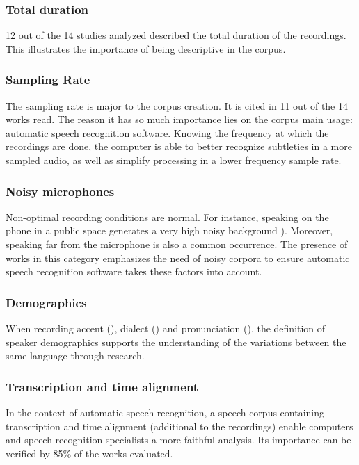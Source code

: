 \subsubsection{Total duration}

12 out of the 14 studies analyzed described the total duration of the recordings. This illustrates the importance of being descriptive in the corpus.

\subsubsection{Sampling Rate}

The sampling rate is major to the corpus creation. It is cited in 11 out of the 14 works read. The reason it has so much importance lies on the corpus main usage: automatic speech recognition software. Knowing the frequency at which the recordings are done, the computer is able to better recognize subtleties in a more sampled audio, as well as simplify processing in a lower frequency sample rate.

\subsubsection{Noisy microphones}

Non-optimal recording conditions are normal. For instance, speaking on the phone in a public space generates a very high noisy background \cite{moore2017sheffield}). Moreover, speaking far from the microphone is also a common occurrence. The presence of works in this category emphasizes the need of noisy corpora to ensure automatic speech recognition software takes these factors into account.

\subsubsection{Demographics}

When recording accent (\cite{moore2017sheffield}), dialect (\cite{almeman2018building}) and pronunciation (\cite{ng2017shefce}), the definition of speaker demographics supports the understanding of the variations between the same language through research.

\subsubsection{Transcription and time alignment}

In the context of automatic speech recognition, a speech corpus containing  transcription and time alignment (additional to the recordings) enable computers and speech recognition specialists a more faithful analysis. Its importance can be verified by 85\% of the works evaluated.

